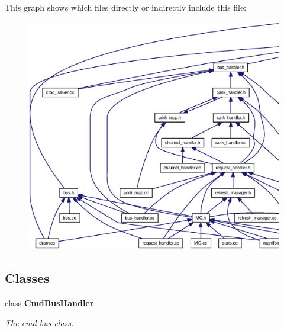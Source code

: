 This graph shows which files directly or indirectly include this file:\nopagebreak
\begin{figure}[H]
\begin{center}
\leavevmode
\includegraphics[width=420pt]{cmd__bus__handler_8h__dep__incl}
\end{center}
\end{figure}
\subsection*{Classes}
\begin{CompactItemize}
\item 
class {\bf CmdBusHandler}
\begin{CompactList}\small\item\em The cmd bus class. \item\end{CompactList}\end{CompactItemize}
